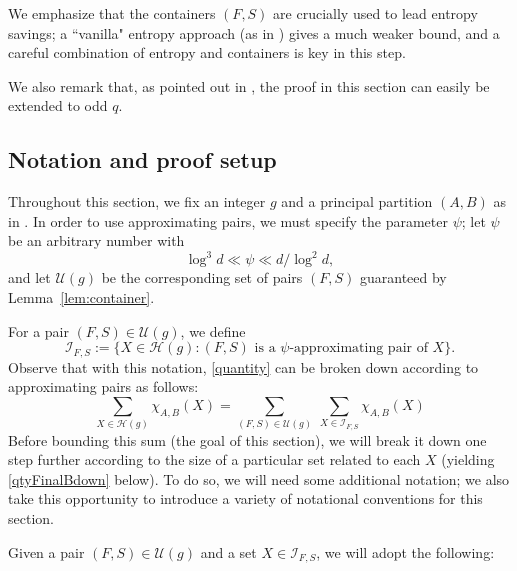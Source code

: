 \documentclass{amsart}
\theoremstyle{definition}
\newcommand{\cH}{\mathcal{H} }
\newcommand{\cI}{\mathcal{I} }
\newcommand{\cU}{\mathcal{U} }
\newcommand{\beq}[1]{\begin{equation}\label{#1}}
\newcommand{\enq}[0]{\end{equation}}
\newcommand{\0}[0]{\emptyset}
\begin{document}
We emphasize that the containers $(F,S)$ are crucially used to lead entropy savings; a ``vanilla" entropy approach (as in ) gives a much weaker bound, and a careful combination of entropy and containers is key in this step.


We also remark that, as pointed out in , the proof in this section can easily be extended to odd $q$.



\subsection{Notation and proof setup}

Throughout this section, we fix an integer $g$ and a principal partition $(A,B)$ as in . In order to use approximating pairs, we must specify the parameter $\psi$; let $\psi$ be an arbitrary number with
\beq{psi.bd} \log^3 d \ll \psi \ll d/\log^2 d,\enq 
and let $\cU(g)$ be the corresponding set of pairs $(F,S)$ guaranteed by Lemma~\ref{lem:container}. 

For a pair $(F, S)\in \cU(g)$, we define 
\[
\mathcal{I}_{F, S}:=\{X\in\cH(g): \mbox{$(F,S)$ is a $\psi$-approximating pair of $X$}\}.
\]
Observe that with this notation, \eqref{quantity} can be broken down according to approximating pairs as follows:
\beq{qtyBreakdown}
	\sum_{X \in \cH(g)} \chi_{A,B}(X) = \sum_{(F,S)\in\cU(g)}\ \sum_{X\in \cI_{F,S}} \chi_{A,B}(X)
\enq
Before bounding this sum (the goal of this section), we will break it down one step further  according to the size of a particular set related to each $X$ (yielding \eqref{qtyFinalBdown} below). To do so, we will need some additional notation; we also take this opportunity to introduce a variety of notational conventions for this section.

Given a pair $(F,S)\in \cU(g)$ and a set $X\in \cI_{F,S}$, we will adopt the following:
\end{document}
